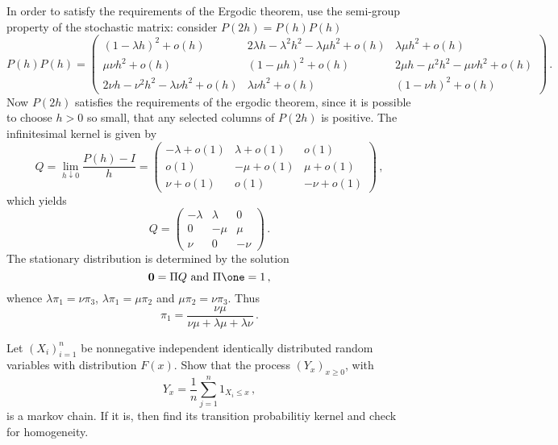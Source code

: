 In order to satisfy the requirements of the Ergodic theorem, use the semi-group
property of the stochastic matrix: consider $P(2h) = P(h)P(h)$
\[
P(h)P(h) = \begin{pmatrix}
	( 1 - \lambda h )^2 + o(h) & 2 \lambda h - \lambda^2 h^2 - \lambda \mu h^2 + o(h) & \lambda \mu h^2 + o(h) \\
	\mu \nu h^2 + o(h) & ( 1 - \mu h )^2 + o(h) & 2 \mu h - \mu^2 h^2 - \mu \nu h^2 + o(h) \\
	2\nu h - \nu^2 h^2 - \lambda \nu h^2 + o(h) & \lambda \nu h^2 + o(h) & ( 1 - \nu h )^2 + o(h)
\end{pmatrix}
\,.\]
Now $P(2h)$ satisfies the requirements of the ergodic theorem, since it is possible
to choose $h>0$ so small, that any selected columns of $P(2h)$ is positive.
The infinitesimal kernel is given by
\[ Q = \lim_{h\downarrow 0} \frac{P(h) - I}{h} = \begin{pmatrix}
		-\lambda + o(1) & \lambda + o(1) & o(1) \\
		o(1) & -\mu + o(1) & \mu + o(1) \\
		\nu + o(1) & o(1) & -\nu + o(1)
	\end{pmatrix} \,, \]
which yields
\[ Q = \begin{pmatrix}
	-\lambda & \lambda & 0 \\ 0 & -\mu & \mu \\ \nu & 0 & -\nu
\end{pmatrix} \,.\]
The stationary distribution is determined by the solution 
\[ \mathbf{0} = \Pi Q \text{ and } \Pi \one = 1 \,, \]
whence $\lambda \pi_1 = \nu \pi_3$, $ \lambda \pi_1 = \mu \pi_2$ and $\mu\pi_2 = \nu\pi_3$.
Thus
\[ \pi_1 = \frac{\nu \mu}{\nu \mu + \lambda \mu + \lambda \nu }\,. \]

Let $(X_i)_{i=1}^n$ be nonnegative independent identically distributed random
variables with distribution $F(x)$. Show that the process $(Y_x)_{x\geq 0}$, with
\[ Y_x = \frac{1}{n} \sum_{j=1}^n 1_{X_i\leq x} \,, \]
is a markov chain. If it is, then find its transition probabilitiy kernel and
check for homogeneity.

